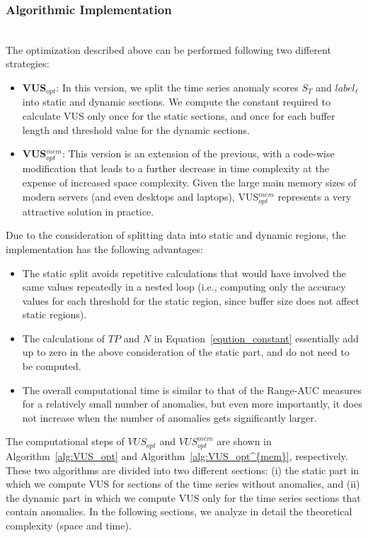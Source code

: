 \subsubsection{Algorithmic Implementation}\hfill\\

The optimization described above can be performed following two different strategies:

\begin{itemize}
\item {\bf VUS$_{opt}$}: In this version, we split the time series anomaly scores $S_T$ and $label_\ell$ into static and dynamic sections. We compute the constant required to calculate VUS only once for the static sections, and once for each buffer length and threshold value for the dynamic sections.
\item {\bf VUS$_{opt}^{mem}$}: This version is an extension of the previous, with a code-wise modification that leads to a further decrease in time complexity at the expense of increased space complexity.
Given the large main memory sizes of modern servers (and even desktops and laptops), VUS$_{opt}^{mem}$ represents a very attractive solution in practice.
\end{itemize}

Due to the consideration of splitting data into static and dynamic regions, the implementation has the following advantages:

\begin{itemize}
\item The static split avoids repetitive calculations that would have involved the same values repeatedly in a nested loop (i.e., computing only the accuracy values for each threshold for the static region, since buffer size does not affect static regions).
\item The calculations of $TP$ and $N$ in Equation~\ref{eqution_constant} essentially add up to zero in the above consideration of the static part, and do not need to be computed. 
\item The overall computational time is similar to that of the Range-AUC measures for a relatively small number of anomalies, but even more importantly, it does not increase when the number of anomalies gets significantly larger.
\end{itemize}

The computational steps of $VUS_{opt}$ and $VUS_{opt}^{mem}$ are shown in Algorithm~\ref{alg:VUS_opt} and Algorithm~\ref{alg:VUS_opt^{mem}}, respectively.
These two algorithms are divided into two different sections: (i) the static part in which we compute VUS for sections of the time series without anomalies, and (ii) the dynamic part in which we compute VUS only for the time series sections that contain anomalies.
In the following sections, we analyze in detail the theoretical complexity (space and time).

